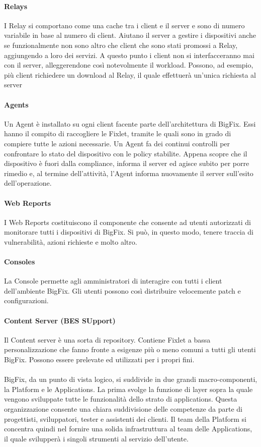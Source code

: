 \paragraph{Relays}
I Relay si comportano come una cache tra i client e il server e sono di numero variabile in base al numero di client. Aiutano il server a gestire i dispositivi anche se funzionalmente non sono altro che client che sono stati promossi a Relay, aggiungendo a loro dei servizi. A questo punto i client non si interfacceranno mai con il server, alleggerendone così notevolmente il workload. Possono, ad esempio, più client richiedere un download al Relay, il quale effettuerà un'unica richiesta al server
\paragraph{Agents}
Un Agent è installato su ogni client facente parte dell'architettura di BigFix. Essi hanno il compito di raccogliere le Fixlet, tramite le quali sono in grado di compiere tutte le azioni necessarie. Un Agent fa dei continui controlli per confrontare lo stato del dispositivo con le policy stabilite. Appena scopre che il dispositivo è fuori dalla compliance, informa il server ed agisce subito per porre rimedio e, al termine dell'attività, l'Agent informa nuovamente il server sull'esito dell'operazione.
\paragraph{Web Reports}
I Web Reports costituiscono il componente che consente ad utenti autorizzati di monitorare tutti i dispositivi di BigFix. Si può, in questo modo, tenere traccia di vulnerabilità, azioni richieste e molto altro.
\paragraph{Consoles}
La Console permette agli amministratori di interagire con tutti i client dell'ambiente BigFix. Gli utenti possono così distribuire velocemente patch e configurazioni.
\paragraph{Content Server (BES SUpport)}
Il Content server è una sorta di repository. Contiene Fixlet a bassa personalizzazione che fanno fronte a esigenze più o meno comuni a tutti gli utenti BigFix. Possono essere prelevate ed utilizzati per i propri fini.
\paragraph{}
BigFix, da un punto di vista logico, si suddivide in due grandi macro-componenti, la Platform e le Applications. La prima svolge la funzione di layer sopra la quale vengono sviluppate tutte le funzionalità dello strato di applications. Questa organizzazione consente una chiara suddivisione delle competenze da parte di progettisti, sviluppatori, tester e assistenti dei clienti. Il team della Platform si concentra quindi nel fornire una solida infrastruttura al team delle Applications, il quale svilupperà i singoli strumenti al servizio dell'utente.
